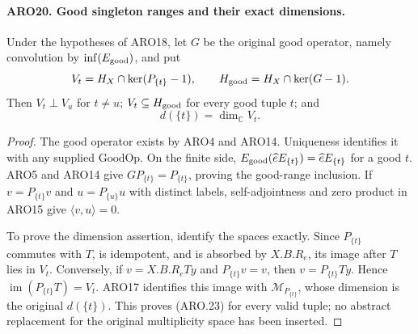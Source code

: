 \documentclass[11pt,a4paper]{article}
\numberwithin{equation}{section}
\theoremstyle{remark}\newtheorem{remark}[theorem]{Remark}
\begin{document}
\paragraph{ARO20. Good singleton ranges and their exact dimensions.}
\label{claim:ARO20}
Under the hypotheses of ARO18, let \(G\) be the original good operator,
namely convolution by
\(\operatorname{inf}(E_{\rm good})\), and put
\[
 V_t=H_X\cap\ker(P_{\{t\}}-1),\qquad
 H_{\rm good}=H_X\cap\ker(G-1).
\]
Then \(V_t\perp V_u\) for \(t\ne u\);
\(V_t\subseteq H_{\rm good}\) for every good tuple \(t\); and
\[
                         d(\{t\})=\dim_{\mathbb C}V_t.
 \tag{ARO.23}
\]
\begin{proof}
The good operator exists by ARO4 and ARO14.  Uniqueness identifies
it with any supplied \(\mathrm{GoodOp}\).  On the finite side,
\(E_{\rm good}(\widehat eE_{\{t\}})=\widehat eE_{\{t\}}\)
for a good \(t\).  ARO5 and ARO14 give
\(GP_{\{t\}}=P_{\{t\}}\), proving the good-range inclusion.
If \(v=P_{\{t\}}v\) and \(u=P_{\{u\}}u\) with distinct labels,
self-adjointness and zero product in ARO15 give \(\langle v,u\rangle=0\).

To prove the dimension assertion, identify the spaces exactly.
Since \(P_{\{t\}}\) commutes with \(T\), is idempotent, and is
absorbed by \(X.B.R_e\), its image after \(T\) lies in \(V_t\).
Conversely, if \(v=X.B.R_eTy\) and \(P_{\{t\}}v=v\), then
\(v=P_{\{t\}}Ty\).  Hence
\(\operatorname{im}(P_{\{t\}}T)=V_t\).
ARO17 identifies this image with \(\mathcal M_{P_{\{t\}}}\),
whose dimension is the original \(d(\{t\})\).  This proves (ARO.23)
for every valid tuple; no abstract replacement for the original
multiplicity space has been inserted.
\end{proof}

\end{document}
